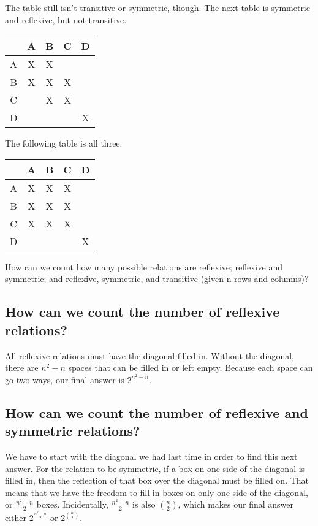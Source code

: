 The table still isn't transitive or symmetric, though. The next table is symmetric and reflexive, but not transitive.
\begin{center}
\begin{tabular} {c|c c c c}
& A & B & C & D \\
\hline
A & X & X &  &  \\
B & X & X & X &  \\
C &  & X & X &  \\
D &  &  &  & X \\
\end{tabular}
\end{center}
The following table is all three:
\begin{center}
\begin{tabular} {c|c c c c}
& A & B & C & D \\
\hline
A & X & X & X &  \\
B & X & X & X &  \\
C & X & X & X &  \\
D &  &  &  & X \\
\end{tabular}
\end{center}
How can we count how many possible relations are reflexive; reflexive and symmetric; and reflexive, symmetric, and transitive (given n rows and columns)?
\subsection{How can we count the number of reflexive relations?}
All reflexive relations must have the diagonal filled in. Without the diagonal, there are \(n^{2} - n\) spaces that can be filled in or left empty. Because each space can go two ways, our final answer is \(2^{n^{2}-n}\).
\subsection{How can we count the number of reflexive and symmetric relations?}
We have to start with the diagonal we had last time in order to find this next answer. For the relation to be symmetric, if a box on one side of the diagonal is filled in, then the reflection of that box over the diagonal must be filled on. That means that we have the freedom to fill in boxes on only one side of the diagonal, or \(\frac{n^{2}-n}{2}\) boxes. Incidentally, \(\frac{n^{2}-n}{2}\) is also \(\binom{n}{2}\), which makes our final answer either \(2^{\frac{n^{2}-n}{2}}\) or \(2^{\binom{n}{2}}\).
